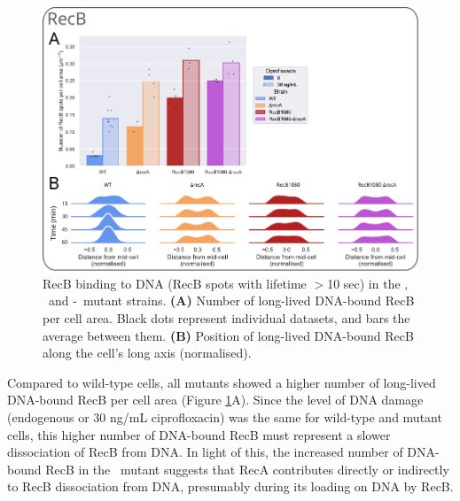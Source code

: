 \begin{figure}[htbp]
    \centering
    \includegraphics[width=\textwidth]{Figures/Fig5_mutants.pdf}
    \caption{RecB binding to DNA (RecB spots with lifetime $>$10 sec) in the \dreca, \teneighty\ and \dreca-\teneighty\ mutant strains. \textbf{(A)} Number of long-lived DNA-bound RecB per cell area. Black dots represent individual datasets, and bars the average between them. \textbf{(B)} Position of long-lived DNA-bound RecB along the cell's long axis (normalised).}
    \label{Fig:mutants}
\end{figure}

Compared to wild-type cells, all mutants showed a higher number of long-lived DNA-bound RecB per cell area (Figure \ref{Fig:mutants}A). Since the level of DNA damage (endogenous or 30 ng/mL ciprofloxacin) was the same for wild-type and mutant cells, this higher number of DNA-bound RecB must represent a slower dissociation of RecB from DNA. In light of this, the increased number of DNA-bound RecB in the \dreca\ mutant suggests that RecA contributes directly or indirectly to RecB dissociation from DNA, presumably during its loading on DNA by RecB.

